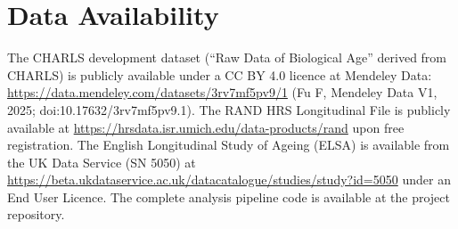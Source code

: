 \documentclass[11pt,a4paper]{article}
\begin{document}
\section*{Data Availability}
The CHARLS development dataset (``Raw Data of Biological Age'' derived from CHARLS) is publicly
available under a CC BY 4.0 licence at Mendeley Data:
\url{https://data.mendeley.com/datasets/3rv7mf5pv9/1} (Fu F, Mendeley Data V1, 2025;
doi:10.17632/3rv7mf5pv9.1). The RAND HRS Longitudinal File is publicly available at
\url{https://hrsdata.isr.umich.edu/data-products/rand} upon free registration. The English
Longitudinal Study of Ageing (ELSA) is available from the UK Data Service (SN 5050) at
\url{https://beta.ukdataservice.ac.uk/datacatalogue/studies/study?id=5050} under an End User
Licence. The complete analysis pipeline code is available at the project repository.
\end{document}
